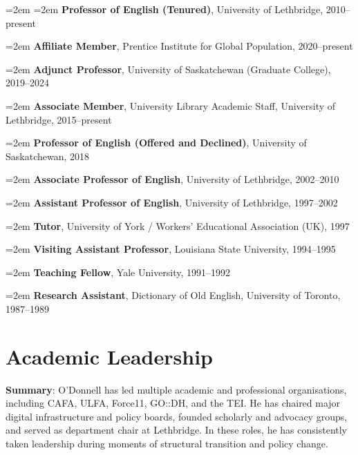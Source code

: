 \documentclass[12pt]{article}
\begin{document}
{\leftskip=2em
\hangindent=2em
\noindent
\textbf{Professor of English (Tenured)}, University of Lethbridge, 2010–present


\hangindent=2em
\noindent
\textbf{Affiliate Member}, Prentice Institute for Global Population, 2020–present


\hangindent=2em
\noindent
\textbf{Adjunct Professor}, University of Saskatchewan (Graduate College), 2019–2024


\hangindent=2em
\noindent
\textbf{Associate Member}, University Library Academic Staff, University of Lethbridge, 2015–present


\hangindent=2em
\noindent
\textbf{Professor of English (Offered and Declined)}, University of Saskatchewan, 2018


\hangindent=2em
\noindent
\textbf{Associate Professor of English}, University of Lethbridge, 2002–2010


\hangindent=2em
\noindent
\textbf{Assistant Professor of English}, University of Lethbridge, 1997–2002


\hangindent=2em
\noindent
\textbf{Tutor}, University of York / Workers’ Educational Association (UK), 1997


\hangindent=2em
\noindent
\textbf{Visiting Assistant Professor}, Louisiana State University, 1994–1995


\hangindent=2em
\noindent
\textbf{Teaching Fellow}, Yale University, 1991–1992


\hangindent=2em
\noindent
\textbf{Research Assistant}, Dictionary of Old English, University of Toronto, 1987–1989

}

\section*{Academic Leadership}

\textbf{Summary}: O'Donnell has led multiple academic and professional organisations, including CAFA, ULFA, Force11, GO::DH, and the TEI. He has chaired major digital infrastructure and policy boards, founded scholarly and advocacy groups, and served as department chair at Lethbridge. In these roles, he has consistently taken leadership during moments of structural transition and policy change.
\end{document}
